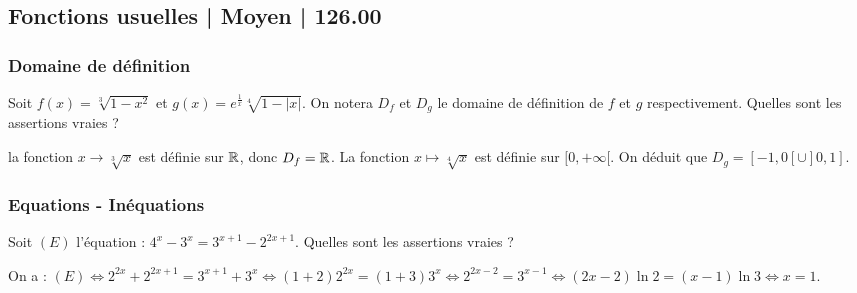 \subsection{Fonctions usuelles | Moyen | 126.00}

\subsubsection{Domaine de définition}

\begin{question} 
Soit $f(x)= \sqrt[3]{1-x^2}$ et $ g(x)= e^{\frac{1}{x}}\sqrt[4]{1-|x|} $. On notera $D_f$ et $D_g$ le domaine de définition de $f$ et $g$ respectivement. Quelles sont les assertions vraies ?
\begin{answers}



\end{answers}
\begin{explanations}
la fonction $x\to \sqrt[3]{x}$ est définie sur $\mathbb{R}$, donc $D_f=\mathbb{R}$. La fonction $x\mapsto \sqrt[4]{x}$ est définie sur $[0,+\infty[$. On déduit que  $D_g=[-1,0[\cup ]0,1]$.
\end{explanations}

\end{question}



\subsubsection{Equations - Inéquations}

\begin{question} 
Soit $(E)$ l'équation : $ 4^x-3^x=3^{x+1}- 2^{2x+1}$. Quelles sont les assertions vraies ?

\begin{answers}



\end{answers}
\begin{explanations}
On a : $(E) \Leftrightarrow 2^{2x}+ 2^{2x+1} = 3^{x+1}+3^x \Leftrightarrow (1+2)2^{2x}=(1+3)3^{x}  \Leftrightarrow 2^{2x-2} =3^{x-1} \Leftrightarrow (2x-2)\ln 2=(x-1) \ln 3 \Leftrightarrow  x=1$.
\end{explanations}


\end{question}





